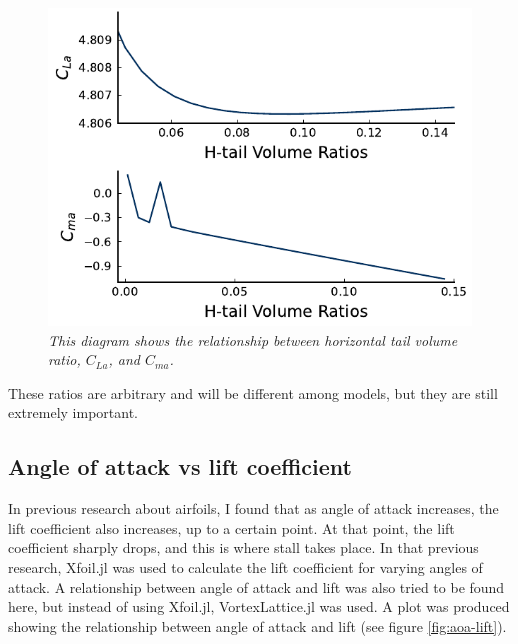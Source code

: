 \documentclass{journal}
\begin{document}
	\begin{figure}[H]
		\centering
		\includegraphics[scale=0.73]{../graphics/htail-stability.pdf}
		\caption{\emph{This diagram shows the relationship between horizontal tail volume ratio, \(C_{La}\), and \(C_{ma}\).}}
		\label{fig:htail-stability}
	\end{figure}
	
	These ratios are arbitrary and will be different among models, but they are still extremely important. \\
	
	\subsection{Angle of attack vs lift coefficient}
	
	In previous research about airfoils, I found that as angle of attack increases, the lift coefficient also increases, up to a certain point. At that point, the lift coefficient sharply drops, and this is where stall takes place. In that previous research, Xfoil.jl was used to calculate the lift coefficient for varying angles of attack. A relationship between angle of attack and lift was also tried to be found here, but instead of using Xfoil.jl, VortexLattice.jl was used. A plot was produced showing the relationship between angle of attack and lift (see figure \ref{fig:aoa-lift}). \\
	
\end{document}
